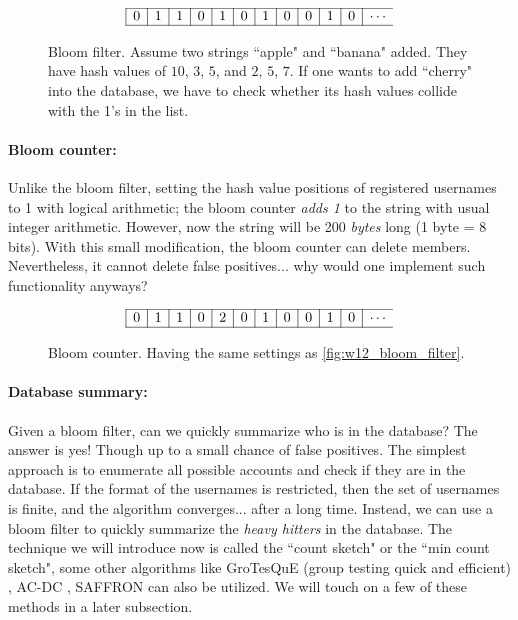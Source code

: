 \begin{figure}[H]
    \centering
    \begin{equation*}\begin{array}{|c|c|c|c|c|c|c|c|c|c|c|c}
        \hline
        0 & 1 & 1 & 0 & 1 & 0 & 1 & 0 & 0 & 1 & 0 & \cdots \\
        \hline
    \end{array}\end{equation*}
    \caption{Bloom filter. Assume two strings ``apple" and ``banana" added. They have hash values of $10$, $3$, $5$, and $2$, $5$, $7$. If one wants to add ``cherry" into the database, we have to check whether its hash values collide with the 1's in the list.}
    \label{fig:w12_bloom_filter}
\end{figure}

\paragraph{Bloom counter:} Unlike the bloom filter, setting the hash value positions of registered usernames to 1 with logical arithmetic; the bloom counter \textit{adds 1} to the string with usual integer arithmetic. However, now the string will be 200 \textit{bytes} long (1 byte = 8 bits). With this small modification, the bloom counter can delete members. Nevertheless, it cannot delete false positives... why would one implement such functionality anyways?

\begin{figure}[H]
    \centering
    \begin{equation*}\begin{array}{|c|c|c|c|c|c|c|c|c|c|c|c}
        \hline
        0 & 1 & 1 & 0 & 2 & 0 & 1 & 0 & 0 & 1 & 0 & \cdots \\
        \hline
    \end{array}\end{equation*}
    \caption{Bloom counter. Having the same settings as \autoref{fig:w12_bloom_filter}.}
    \label{fig:w12_bloom_counter}
\end{figure}

\paragraph{Database summary:} Given a bloom filter, can we quickly summarize who is in the database? The answer is yes! Though up to a small chance of false positives. The simplest approach is to enumerate all possible accounts and check if they are in the database. If the format of the usernames is restricted, then the set of usernames is finite, and the algorithm converges... after a long time. Instead, we can use a bloom filter to quickly summarize the \textit{heavy hitters} in the database. The technique we will introduce now is called the ``count sketch" or the ``min count sketch", some other algorithms like GroTesQuE (group testing quick and efficient) \cite{grotesque_GT}, AC-DC \cite{AC-DC_GT}, SAFFRON \cite{saffron_GT} can also be utilized. We will touch on a few of these methods in a later subsection.

